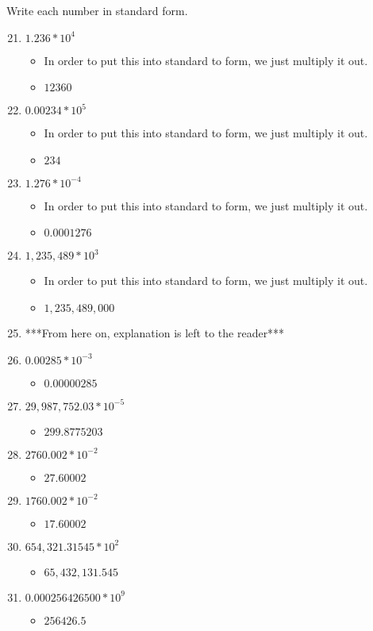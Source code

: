 Write each number in standard form.
\begin{enumerate}
\setcounter{enumi}{20}
\item $1.236*10^{4}$
  \begin{itemize}
  \item In order to put this into standard to form, we just multiply it out.
  \item $12360$
  \end{itemize}
\item $0.00234*10^{5}$
  \begin{itemize}
  \item In order to put this into standard to form, we just multiply it out.
  \item $234$
  \end{itemize}
\item $1.276*10^{-4}$
  \begin{itemize}
  \item In order to put this into standard to form, we just multiply it out.
  \item $0.0001276$
  \end{itemize}
\item $1,235,489*10^{3}$
  \begin{itemize}
  \item In order to put this into standard to form, we just multiply it out.
  \item $1,235,489,000$
  \end{itemize}
\item [] ***From here on, explanation is left to the reader***
\item $0.00285*10^{-3}$
  \begin{itemize}
  \item $0.00000285$
  \end{itemize}
\item $29,987,752.03*10^{-5}$
  \begin{itemize}
  \item $299.8775203$
  \end{itemize}
\item $2760.002*10^{-2}$
  \begin{itemize}
  \item $27.60002$
  \end{itemize}
\item $1760.002*10^{-2}$
  \begin{itemize}
  \item $17.60002$
  \end{itemize}
\item $654,321.31545*10^{2}$
  \begin{itemize}
  \item $65,432,131.545$
  \end{itemize}
\item $0.000256426500*10^{9}$
  \begin{itemize}
  \item $256426.5$
  \end{itemize}
\end{enumerate}

